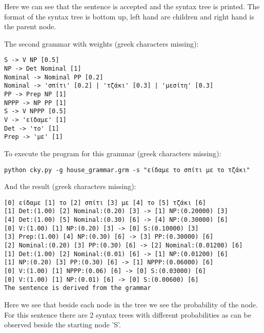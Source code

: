 \documentclass{article}
\begin{document}
Here we can see that the sentence is accepted and the syntax tree is printed.
The format of the syntax tree is bottom up, left hand are children and right
hand is the parent node.

The second grammar with weights (greek characters missing):
\begin{lstlisting}
S -> V NP [0.5]
NP -> Det Nominal [1]
Nominal -> Nominal PP [0.2]
Nominal -> 'σπίτι' [0.2] | 'τζάκι' [0.3] | 'μεσίτη' [0.3]
PP -> Prep NP [1]
NPPP -> NP PP [1]
S -> V NPPP [0.5]
V -> 'είδαμε' [1]
Det -> 'το' [1]
Prep -> 'με' [1]
\end{lstlisting}

To execute the program for this grammar (greek characters missing):
\begin{lstlisting}
python cky.py -g house_grammar.grm -s "είδαμε το σπίτι με το τζάκι"
\end{lstlisting}

And the result (greek characters missing):
\begin{lstlisting}
[0] είδαμε [1] το [2] σπίτι [3] με [4] το [5] τζάκι [6]
[1] Det:(1.00) [2] Nominal:(0.20) [3] -> [1] NP:(0.20000) [3]
[4] Det:(1.00) [5] Nominal:(0.30) [6] -> [4] NP:(0.30000) [6]
[0] V:(1.00) [1] NP:(0.20) [3] -> [0] S:(0.10000) [3]
[3] Prep:(1.00) [4] NP:(0.30) [6] -> [3] PP:(0.30000) [6]
[2] Nominal:(0.20) [3] PP:(0.30) [6] -> [2] Nominal:(0.01200) [6]
[1] Det:(1.00) [2] Nominal:(0.01) [6] -> [1] NP:(0.01200) [6]
[1] NP:(0.20) [3] PP:(0.30) [6] -> [1] NPPP:(0.06000) [6]
[0] V:(1.00) [1] NPPP:(0.06) [6] -> [0] S:(0.03000) [6]
[0] V:(1.00) [1] NP:(0.01) [6] -> [0] S:(0.00600) [6]
The sentence is derived from the grammar
\end{lstlisting}

Here we see that beside each node in the tree we see the probability of the
node. For this sentence there are 2 syntax trees with different probabilities as
can be observed beside the starting node 'S'.
\end{document}
